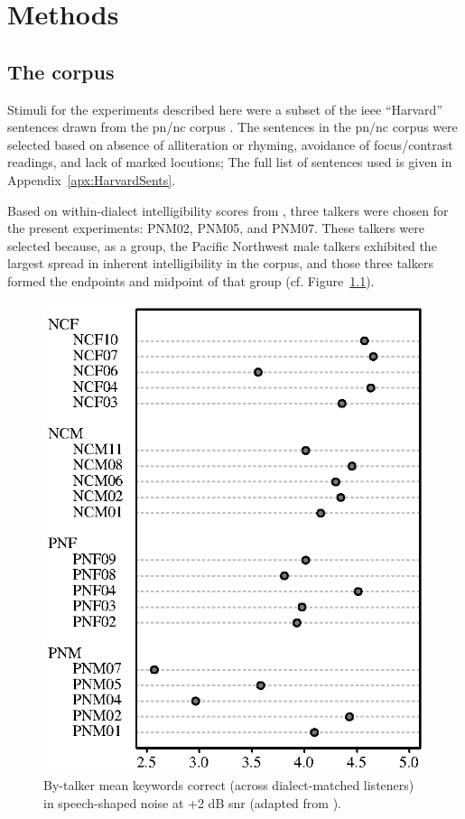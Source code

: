\chapter{Methods}
\section{The corpus}
Stimuli for the experiments described here were a subset of the \ac{ieee} “Harvard” sentences \citep{HarvardSents} drawn from the \ac{pn/nc} corpus \citep{xxx}.  The sentences in the \ac{pn/nc} corpus were selected based on absence of alliteration or rhyming, avoidance of focus/contrast readings, and lack of marked locutions; The full list of sentences used is given in Appendix~\ref{apx:HarvardSents}.  

Based on within-dialect intelligibility scores from \citet{McCloyEtAl2013}, three talkers were chosen for the present experiments: PNM02, PNM05, and PNM07.  These talkers were selected because, as a group, the Pacific Northwest male talkers exhibited the largest spread in inherent intelligibility in the corpus, and those three talkers formed the endpoints and midpoint of that group (cf. Figure~\ref{fig:dotchart}).

\begin{figure}
	\begin{centering}
	\includegraphics{figures/dotchart.eps}
	\caption[Intelligibility of talkers used to make the stimuli]{By-talker mean keywords correct (across dialect-matched listeners) in speech-shaped noise at +2 dB \ac{snr} (adapted from \citet{McCloyEtAl2013}).\label{fig:dotchart}}
	\end{centering}
\end{figure}

